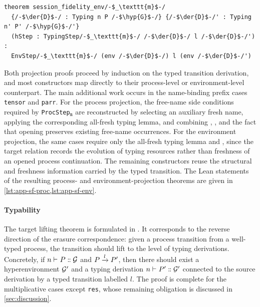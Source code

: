 \begin{lstlisting}[language=Lean4]
theorem session_fidelity_env/-$_\texttt{m}$-/
  {/-$\der{D}$-/ : Typing n P /-$\hyp{G}$-/} {/-$\der{D}$-/' : Typing n' P' /-$\hyp{G}$-/'}
  (hStep : TypingStep/-$_\texttt{m}$-/ /-$\der{D}$-/ l /-$\der{D}$-/') :
  EnvStep/-$_\texttt{m}$-/ (env /-$\der{D}$-/) l (env /-$\der{D}$-/')
\end{lstlisting}

Both projection proofs proceed by induction on the typed transition derivation, and most constructors map directly to their process-level or environment-level counterpart. The main additional work occurs in the name-binding prefix cases \texttt{tensor} and \texttt{parr}. For the process projection, the free-name side conditions required by \texttt{ProcStep}$_{\texttt{m}}$ are reconstructed by selecting an auxiliary fresh name, applying the corresponding all-fresh typing lemma, and combining , , and the fact that opening preserves existing free-name occurrences. For the environment projection, the same cases require only the all-fresh typing lemma and , since the target relation records the evolution of typing resources rather than freshness of an opened process continuation. The remaining constructors reuse the structural and freshness information carried by the typed transition. The Lean statements of the resulting process- and environment-projection theorems are given in \cref{lst:app-sf-proc,lst:app-sf-env}.


\paragraph{Typability} The target lifting theorem is formulated in . It corresponds to the reverse direction of the erasure correspondence: given a process transition from a well-typed process, the transition should lift to the level of typing derivations. Concretely, if ${{}n \vdash_{} P \mathrel{:\mspace{-1mu}:} \mathcal{G}}$ and $P \xrightarrow{l} P'$, then there should exist a hyperenvironment $\mathcal{G}'$ and a typing derivation ${{}n \vdash_{} P' \mathrel{:\mspace{-1mu}:} \mathcal{G}'}$ connected to the source derivation by a typed transition labelled $l$. The proof is complete for the multiplicative cases except \texttt{res}, whose remaining obligation is discussed in \cref{sec:discussion}.

